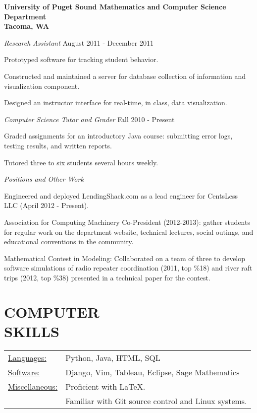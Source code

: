 \documentclass[line,margin]{res}
\newenvironment{itemize*}%
  {\begin{itemize}%
    \setlength{\parsep}{0pt}
    \setlength{\itemsep}{0pt}%
    \setlength{\parskip}{0pt}}%
  {\end{itemize}}
\begin{document}
\begin{resume}
\textbf{University of Puget Sound
Mathematics and Computer Science Department\\
Tacoma, WA}

{\sl Research Assistant} \hfill August 2011 - December 2011
\begin{itemize*}
    \item Prototyped software for tracking student behavior.
    \item Constructed and maintained a server for database collection of 
      information and visualization component.
    \item Designed an instructor interface for real-time, in class, data 
      visualization.
\end{itemize*}            

{\sl Computer Science Tutor and Grader} \hfill Fall 2010 - Present
\begin{itemize*}  
    \item Graded assignments for an introductory Java course: submitting 
      error logs, testing results, and written reports.
    \item Tutored three to six students several hours weekly.
\end{itemize*}

{\sl Positions and Other Work }
\begin{itemize*}
\item Engineered and deployed LendingShack.com as a lead engineer for CentsLess LLC 
    (April 2012 - Present).
\item Association for Computing Machinery Co-President (2012-2013): gather
    students for regular work on the department website, technical lectures,
    social outings, and educational conventions in the community.
\item Mathematical Contest in Modeling: Collaborated on a team of three to 
    develop software simulations of radio repeater coordination (2011, top \%18) and river 
    raft trips (2012, top \%38) presented in a technical paper for the contest.\\
\end{itemize*}

\vspace*{.2cm} 

\section{COMPUTER \\ SKILLS}

\begin{tabular}{l l}
   \underline{Languages:} & Python, Java, HTML, SQL\\
   \underline{Software:} & Django, Vim, Tableau, Eclipse, Sage Mathematics\\
   \underline{Miscellaneous:} & Proficient with LaTeX. \\
                              &  Familiar with Git source control and Linux systems.
  \end{tabular}

\end{resume}
\end{document}
